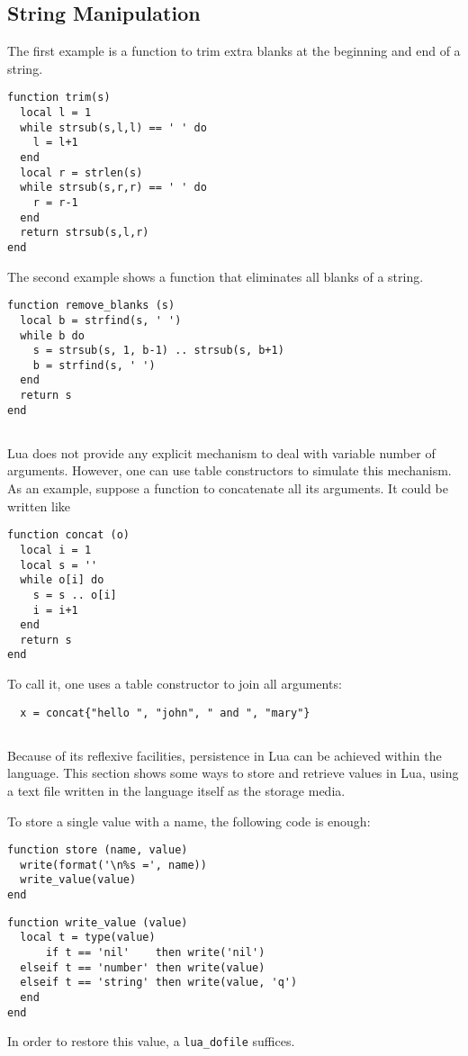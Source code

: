 \subsection{String Manipulation} \label{exstring}

The first example is a function to trim extra blanks at the beginning
and end of a string.
\begin{verbatim}
function trim(s)
  local l = 1
  while strsub(s,l,l) == ' ' do
    l = l+1
  end
  local r = strlen(s)
  while strsub(s,r,r) == ' ' do
    r = r-1
  end
  return strsub(s,l,r)
end
\end{verbatim}

The second example shows a function that eliminates all blanks
of a string.
\begin{verbatim}
function remove_blanks (s)
  local b = strfind(s, ' ')
  while b do
    s = strsub(s, 1, b-1) .. strsub(s, b+1)
    b = strfind(s, ' ')
  end
  return s
end
\end{verbatim}


\subsection{}
Lua does not provide any explicit mechanism to deal with
variable number of arguments.
However, one can use table constructors to simulate this mechanism.
As an example, suppose a function to concatenate all its arguments.
It could be written like 
\begin{verbatim}
function concat (o)
  local i = 1
  local s = ''
  while o[i] do
    s = s .. o[i]
    i = i+1
  end
  return s
end
\end{verbatim}
To call it, one uses a table constructor to join all arguments:
\begin{verbatim}
  x = concat{"hello ", "john", " and ", "mary"}
\end{verbatim}

\subsection{}
Because of its reflexive facilities,
persistence in Lua can be achieved within the language.
This section shows some ways to store and retrieve values in Lua,
using a text file written in the language itself as the storage media.

To store a single value with a name,
the following code is enough:
\begin{verbatim}
function store (name, value)
  write(format('\n%s =', name))
  write_value(value)
end
\end{verbatim}
\begin{verbatim}
function write_value (value)
  local t = type(value)
      if t == 'nil'    then write('nil')
  elseif t == 'number' then write(value)
  elseif t == 'string' then write(value, 'q')
  end
end
\end{verbatim}
In order to restore this value, a \verb'lua_dofile' suffices.

